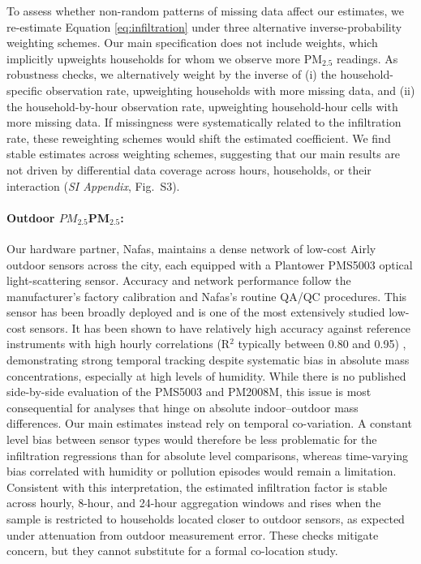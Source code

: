 \documentclass[reqno,12pt,notitlepage]{article}
\providecommand{\DIFadd}[1]{{\protect\color{BLUE}#1}} %
\providecommand{\DIFdel}[1]{{\protect\color{red}\sout{#1}}} %
\providecommand{\DIFaddbegin}{} %
\providecommand{\DIFaddend}{} %
\providecommand{\DIFdelbegin}{} %
\providecommand{\DIFdelend}{} %
\begin{document}
\DIFadd{To assess whether non-random patterns of missing data affect our estimates, we re-estimate Equation \ref{eq:infiltration} under three alternative inverse-probability weighting schemes. Our main specification does not include weights, which implicitly upweights households for whom we observe more PM$_{2.5}$ readings. As robustness checks, we alternatively weight by the inverse of (i) the household-specific observation rate, upweighting households with more missing data, and (ii) the household-by-hour observation rate, upweighting household-hour cells with more missing data. If missingness were systematically related to the infiltration rate, these reweighting schemes would shift the estimated coefficient. We find stable estimates across weighting schemes, suggesting that our main results are not driven by differential data coverage across hours, households, or their interaction (\textit{SI Appendix}, Fig.\ S3).
}

\DIFaddend \paragraph{Outdoor \DIFdelbegin \DIFdel{$PM_{2.5}$}\DIFdelend \DIFaddbegin \DIFadd{PM$_{2.5}$}\DIFaddend :} Our hardware partner, Nafas, maintains a dense network of low-cost Airly outdoor sensors across the city, each equipped with a Plantower PMS5003 optical light-scattering sensor. Accuracy and network performance follow the manufacturer's factory calibration and Nafas's routine QA/QC procedures. \DIFaddbegin \DIFadd{This sensor has been broadly deployed and is one of the most extensively studied low-cost sensors. It has been shown to have relatively high accuracy against reference instruments with high hourly correlations (R$^2$ typically between 0.80 and 0.95) \citep{Sayahi2019, Zheng2018}, demonstrating strong temporal tracking despite systematic bias in absolute mass concentrations, especially at high levels of humidity.
While there is no published side-by-side evaluation of the PMS5003 and PM2008M, this issue is most consequential for analyses that hinge on absolute indoor--outdoor mass differences. Our main estimates instead rely on temporal co-variation. A constant level bias between sensor types would therefore be less problematic for the infiltration regressions than for absolute level comparisons, whereas time-varying bias correlated with humidity or pollution episodes would remain a limitation. Consistent with this interpretation, the estimated infiltration factor is stable across hourly, 8-hour, and 24-hour aggregation windows and rises when the sample is restricted to households located closer to outdoor sensors, as expected under attenuation from outdoor measurement error. These checks mitigate concern, but they cannot substitute for a formal co-location study.
}
\end{document}
